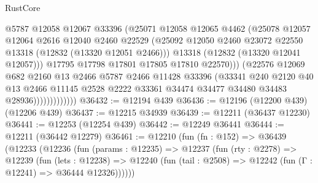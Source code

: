 \begin{lexlean}{RustCore}
\begin{coremodule}
                              @5787
                              @12058
                              @12067
                              @33396
                              (@25071
                                @12058
                                @12065
                                @4462
                                (@25078
                                  @12057
                                  @12064
                                  @2616
                                  @12040
                                  @2460
                                  @22529
                                  (@25092
                                    @12050
                                    @2460
                                    @23072
                                    @22550
                                    @13318
                                    (@12832 (@13320 @12051 @2466)))
                                  @13318
                                  (@12832 (@13320 @12041 @12057)))
                                @17795
                                @17798
                                @17801
                                @17805
                                @17810
                                @22570)))
                          (@22576
                            @12069
                            @682
                            @2160
                            @13
                            @2466
                            @5787
                            @2466
                            @11428
                            @33396
                            (@33341
                              @240
                              @2120
                              @40
                              @13
                              @2466
                              @11145
                              @2528
                              @2222
                              @33361
                              @34474
                              @34477
                              @34480
                              @34483
                              @28936)))))))))))))
@36432 := @12194 @439
@36436 := @12196 (@12200 @439) (@12206 @439)
@36437 := @12215 @34939
@36439 := @12211 (@36437 @12230)
@36441 := @12253 (@12254 @439)
@36442 := @12249 @36441
@36444 := @12211 (@36442 @12279)
@36461 := @12210
    (fun (fn : @152) =>
    @36439
      (@12233
        (@12236
          (fun (params : @12235) =>
          @12237
            (fun (rty : @2278) =>
            @12239
              (fun (lets : @12238) =>
              @12240 (fun (tail : @2508) => @12242 (fun (Γ : @12241) => @36444 @12326))))))

\end{coremodule}
\end{lexlean}
